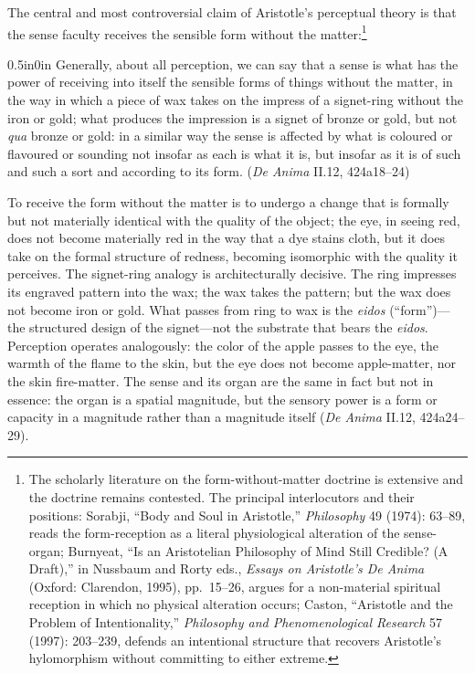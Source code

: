 The central and most controversial claim of Aristotle's perceptual theory is that the sense faculty receives the sensible form without the matter:\footnote{The scholarly literature on the form-without-matter doctrine is extensive and the doctrine remains contested. The principal interlocutors and their positions: Sorabji, ``Body and Soul in Aristotle,'' \textit{Philosophy} 49 (1974): 63--89, reads the form-reception as a literal physiological alteration of the sense-organ; Burnyeat, ``Is an Aristotelian Philosophy of Mind Still Credible? (A Draft),'' in Nussbaum and Rorty eds., \textit{Essays on Aristotle's De Anima} (Oxford: Clarendon, 1995), pp.~15--26, argues for a non-material spiritual reception in which no physical alteration occurs; Caston, ``Aristotle and the Problem of Intentionality,'' \textit{Philosophy and Phenomenological Research} 57 (1997): 203--239, defends an intentional structure that recovers Aristotle's hylomorphism without committing to either extreme.}
\begin{adjustwidth}{0.5in}{0in}
Generally, about all perception, we can say that a sense is what has the power of receiving into itself the sensible forms of things without the matter, in the way in which a piece of wax takes on the impress of a signet-ring without the iron or gold; what produces the impression is a signet of bronze or gold, but not \textit{qua} bronze or gold: in a similar way the sense is affected by what is coloured or flavoured or sounding not insofar as each is what it is, but insofar as it is of such and such a sort and according to its form. (\textit{De Anima} II.12, 424a18--24)
\end{adjustwidth}
To receive the form without the matter is to undergo a change that is formally but not materially identical with the quality of the object; the eye, in seeing red, does not become materially red in the way that a dye stains cloth, but it does take on the formal structure of redness, becoming isomorphic with the quality it perceives. The signet-ring analogy is architecturally decisive. The ring impresses its engraved pattern into the wax; the wax takes the pattern; but the wax does not become iron or gold. What passes from ring to wax is the \textit{eidos} (``form'')---the structured design of the signet---not the substrate that bears the \textit{eidos}. Perception operates analogously: the color of the apple passes to the eye, the warmth of the flame to the skin, but the eye does not become apple-matter, nor the skin fire-matter. The sense and its organ are the same in fact but not in essence: the organ is a spatial magnitude, but the sensory power is a form or capacity in a magnitude rather than a magnitude itself (\textit{De Anima} II.12, 424a24--29).

